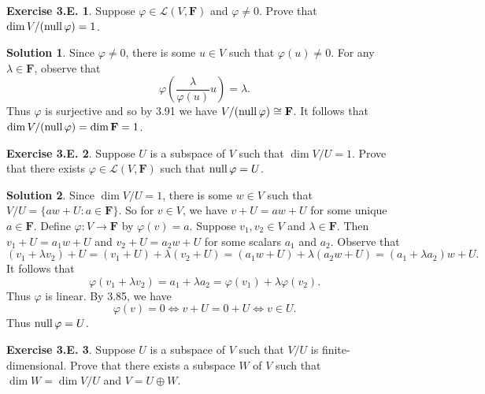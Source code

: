 \documentclass[12pt]{article}
\theoremstyle{definition}
\theoremstyle{exercise}
\newtheorem{exercise}{Exercise 3.E.}
\theoremstyle{solution}
\newtheorem*{solution}{Solution}
\newcommand{\lmap}{\mathcal{L}}
\newcommand{\Null}{\text{null\,}}
\newcommand{\F}{\mathbf{F}}
\begin{document}
\begin{exercise}
\label{ex:15}
    Suppose \( \varphi \in \lmap(V, \F) \) and \( \varphi \neq 0 \). Prove that \( \dim V/(\Null \varphi) = 1 \).
\end{exercise}

\begin{solution}
    Since \( \varphi \neq 0 \), there is some \( u \in V \) such that \( \varphi(u) \neq 0 \). For any \( \lambda \in \F \), observe that
    \[
        \varphi \left( \frac{\lambda}{\varphi(u)} u \right) = \lambda.
    \]
    Thus \( \varphi \) is surjective and so by 3.91 we have \( V / (\Null \varphi) \cong \F \). It follows that \( \dim V/(\Null \varphi) = \dim \F = 1 \).
\end{solution}

\begin{exercise}
\label{ex:16}
    Suppose \( U \) is a subspace of \( V \) such that \( \dim V/U = 1 \). Prove that there exists \( \varphi \in \lmap(V, \F) \) such that \( \Null \varphi = U \).
\end{exercise}

\begin{solution}
    Since \( \dim V/U = 1 \), there is some \( w \in V \) such that \( V/U = \{ aw + U : a \in \F \} \). So for \( v \in V \), we have \( v + U = aw + U \) for some unique \( a \in \F \). Define \( \varphi : V \to \F \) by \( \varphi(v) = a \). Suppose \( v_1, v_2 \in V \) and \( \lambda \in \F \). Then \( v_1 + U = a_1 w + U \) and \( v_2 + U = a_2 w + U \) for some scalars \( a_1 \) and \( a_2 \). Observe that
    \[
        (v_1 + \lambda v_2) + U = (v_1 + U) + \lambda (v_2 + U) = (a_1 w + U) + \lambda (a_2 w + U) = (a_1 + \lambda a_2) w + U.
    \]
    It follows that
    \[
        \varphi(v_1 + \lambda v_2) = a_1 + \lambda a_2 = \varphi(v_1) + \lambda \varphi(v_2).
    \]
    Thus \( \varphi \) is linear. By 3.85, we have
    \[
        \varphi(v) = 0 \iff v + U = 0 + U \iff v \in U.
    \]
    Thus \( \Null \varphi = U \).
\end{solution}

\begin{exercise}
\label{ex:17}
    Suppose \( U \) is a subspace of \( V \) such that \( V/U \) is finite-dimensional. Prove that there exists a subspace \( W \) of \( V \) such that \( \dim W = \dim V/U \) and \( V = U \oplus W \).
\end{exercise}
\end{document}
